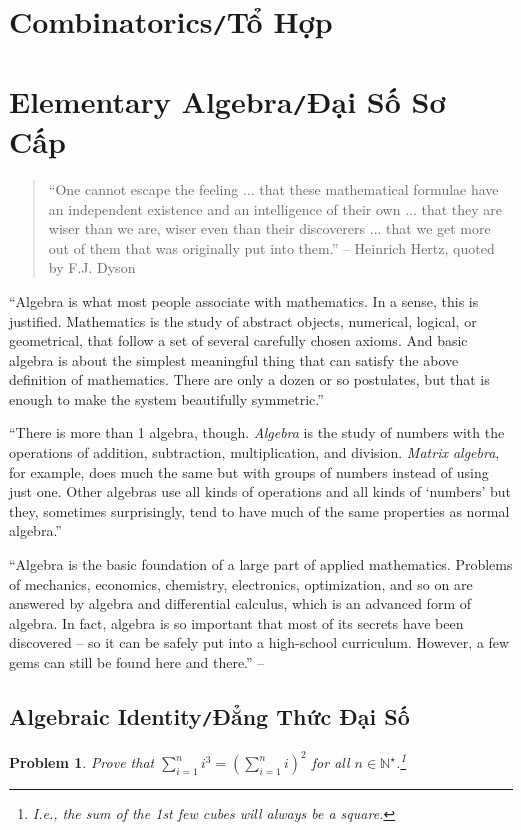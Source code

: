 \documentclass{article}
\numberwithin{equation}{section}
\newtheorem{problem}{Problem}[section]
\begin{document}
\section{Combinatorics\texttt{/}Tổ Hợp}

\section{Elementary Algebra\texttt{/}Đại Số Sơ Cấp}
\begin{quotation}
	``One cannot escape the feeling $\ldots$ that these mathematical formulae have an independent existence and an intelligence of their own $\ldots$ that they are wiser than we are, wiser even than their discoverers $\ldots$ that we get more out of them that was originally put into them.'' -- Heinrich Hertz, quoted by F.J. Dyson
\end{quotation}
``Algebra is what most people associate with mathematics. In a sense, this is justified. Mathematics is the study of abstract objects, numerical, logical, or geometrical, that follow a set of several carefully chosen axioms. And basic algebra is about the simplest meaningful thing that can satisfy the above definition of mathematics. There are only a dozen or so postulates, but that is enough to make the system beautifully symmetric.''

``There is more than 1 algebra, though. \textit{Algebra} is the study of numbers with the operations of addition, subtraction, multiplication, and division. \textit{Matrix algebra}, for example, does much the same but with groups of numbers instead of using just one. Other algebras use all kinds of operations and all kinds of `numbers' but they, sometimes surprisingly, tend to have much of the same properties as normal algebra.''

``Algebra is the basic foundation of a large part of applied mathematics. Problems of mechanics, economics, chemistry, electronics, optimization, and so on are answered by algebra and differential calculus, which is an advanced form of algebra. In fact, algebra is so important that most of its secrets have been discovered -- so it can be safely put into a high-school curriculum. However, a few gems can still be found here and there.'' -- \cite[Chap. 3, p. 35]{Tao2006}

\subsection{Algebraic Identity\texttt{/}Đẳng Thức Đại Số}
\begin{problem}
	Prove that $\sum_{i=1}^n i^3 = \left(\sum_{i=1}^n i\right)^2$ for all $n\in\mathbb{N}^\star$.\footnote{I.e., the sum of the 1st few cubes will always be a square.}
\end{problem}
\end{document}
